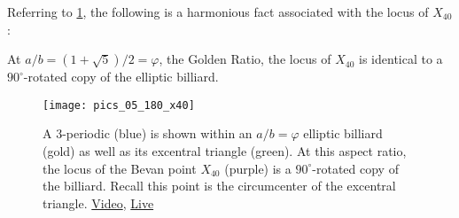 Referring to \cref{fig:05-x40-golden}, the following is a harmonious fact associated with the locus of $X_{40}$:

\begin{corollary}
At $a/b = (1+\sqrt{5})/2=\varphi$, the Golden Ratio, the locus of $X_{40}$ is identical to a $90^\circ$-rotated copy of the elliptic billiard.
\label{cor:05-x40-golden}
\end{corollary}

\begin{figure}
    \centering
    \texttt{[image: pics\_05\_180\_x40]}
    \caption{A 3-periodic (blue) is shown within an $a/b=\varphi$ elliptic billiard (gold) as well as its excentral triangle (green). At this aspect ratio, the locus of the Bevan point $X_{40}$ (purple) is a $90^\circ$-rotated copy of the billiard. Recall this point is the circumcenter of the excentral triangle. \href{https://youtu.be/rg28gGr-Qeo}{Video}, \href{https://bit.ly/3f4eQ6e}{Live}}
    \label{fig:05-x40-golden}
\end{figure}



